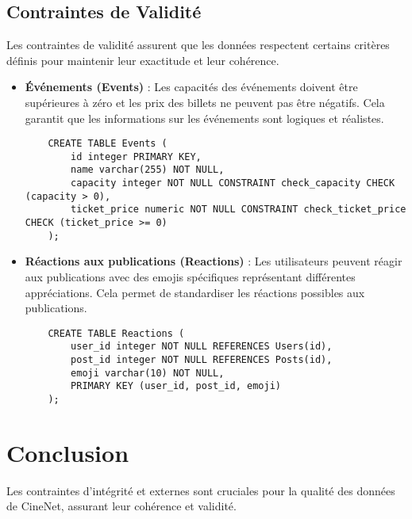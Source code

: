 \subsection{Contraintes de Validité}

Les contraintes de validité assurent que les données respectent certains critères définis pour maintenir leur exactitude et leur cohérence.

\begin{itemize}
    \item \textbf{Événements (Events)} : Les capacités des événements doivent être supérieures à zéro et les prix des billets ne peuvent pas être négatifs. Cela garantit que les informations sur les événements sont logiques et réalistes.
    \begin{lstlisting}
    CREATE TABLE Events (
        id integer PRIMARY KEY,
        name varchar(255) NOT NULL,
        capacity integer NOT NULL CONSTRAINT check_capacity CHECK (capacity > 0),
        ticket_price numeric NOT NULL CONSTRAINT check_ticket_price CHECK (ticket_price >= 0)
    );
    \end{lstlisting}
    \item \textbf{Réactions aux publications (Reactions)} : Les utilisateurs peuvent réagir aux publications avec des emojis spécifiques représentant différentes appréciations. Cela permet de standardiser les réactions possibles aux publications.
    \begin{lstlisting}
    CREATE TABLE Reactions (
        user_id integer NOT NULL REFERENCES Users(id),
        post_id integer NOT NULL REFERENCES Posts(id),
        emoji varchar(10) NOT NULL,
        PRIMARY KEY (user_id, post_id, emoji)
    );
    \end{lstlisting}
\end{itemize}

\section*{Conclusion}

Les contraintes d'intégrité et externes sont cruciales pour la qualité des données de CineNet, assurant leur cohérence et validité.
